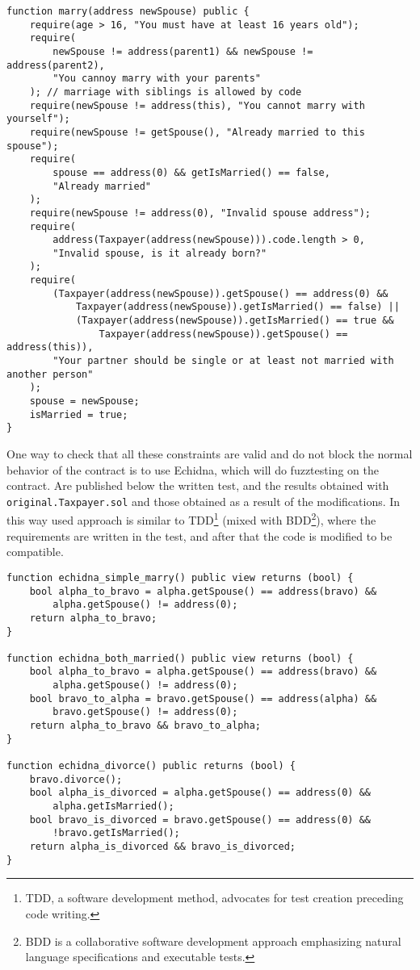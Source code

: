 \documentclass{article}
\begin{document}
\begin{verbatim}
function marry(address newSpouse) public {
    require(age > 16, "You must have at least 16 years old");
    require(
        newSpouse != address(parent1) && newSpouse != address(parent2),
        "You cannoy marry with your parents"
    ); // marriage with siblings is allowed by code
    require(newSpouse != address(this), "You cannot marry with yourself");
    require(newSpouse != getSpouse(), "Already married to this spouse");
    require(
        spouse == address(0) && getIsMarried() == false,
        "Already married"
    );
    require(newSpouse != address(0), "Invalid spouse address");
    require(
        address(Taxpayer(address(newSpouse))).code.length > 0,
        "Invalid spouse, is it already born?"
    );
    require(
        (Taxpayer(address(newSpouse)).getSpouse() == address(0) &&
            Taxpayer(address(newSpouse)).getIsMarried() == false) ||
            (Taxpayer(address(newSpouse)).getIsMarried() == true &&
                Taxpayer(address(newSpouse)).getSpouse() == address(this)),
        "Your partner should be single or at least not married with another person"
    );
    spouse = newSpouse;
    isMarried = true;
}
\end{verbatim}
One way to check that all these constraints are valid and do not block the normal behavior of the contract is to use Echidna, which will do fuzztesting on the contract. Are published below the written test, and the results obtained with \texttt{original.Taxpayer.sol} and those obtained as a result of the modifications. In this way used approach is similar to TDD\footnote{TDD, a software development method, advocates for test creation preceding code writing.} (mixed with BDD\footnote{BDD is a collaborative software development approach emphasizing natural language specifications and executable tests.}), where the requirements are written in the test, and after that the code is modified to be compatible.

\begin{verbatim}
function echidna_simple_marry() public view returns (bool) {
    bool alpha_to_bravo = alpha.getSpouse() == address(bravo) &&
        alpha.getSpouse() != address(0);
    return alpha_to_bravo;
}

function echidna_both_married() public view returns (bool) {
    bool alpha_to_bravo = alpha.getSpouse() == address(bravo) &&
        alpha.getSpouse() != address(0);
    bool bravo_to_alpha = bravo.getSpouse() == address(alpha) &&
        bravo.getSpouse() != address(0);
    return alpha_to_bravo && bravo_to_alpha;
}

function echidna_divorce() public returns (bool) {
    bravo.divorce();
    bool alpha_is_divorced = alpha.getSpouse() == address(0) &&
        alpha.getIsMarried();
    bool bravo_is_divorced = bravo.getSpouse() == address(0) &&
        !bravo.getIsMarried();
    return alpha_is_divorced && bravo_is_divorced;
}
\end{verbatim} 
\end{document}
